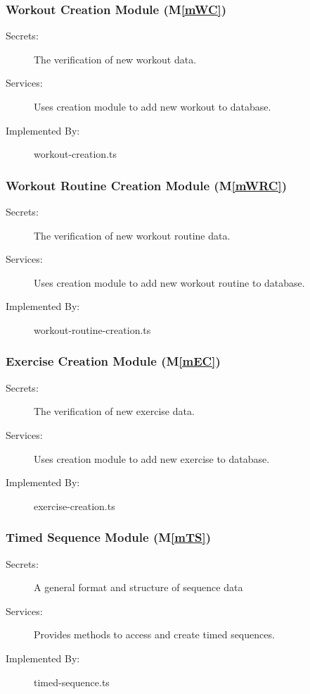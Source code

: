\documentclass[12pt, titlepage]{article}
\newcommand{\mref}[1]{M\ref{#1}}
\begin{document}
\subsubsection{Workout Creation Module (\mref{mWC})}

\begin{description}
\item[Secrets:] The verification of new workout data.
\item[Services:] Uses creation module to add new workout to database.
\item[Implemented By:] workout-creation.ts
\end{description}

\subsubsection{Workout Routine Creation Module (\mref{mWRC})}

\begin{description}
\item[Secrets:] The verification of new workout routine data.
\item[Services:] Uses creation module to add new workout routine to database.
\item[Implemented By:] workout-routine-creation.ts
\end{description}

\subsubsection{Exercise Creation Module (\mref{mEC})}

\begin{description}
\item[Secrets:] The verification of new exercise data.
\item[Services:] Uses creation module to add new exercise to database.
\item[Implemented By:] exercise-creation.ts
\end{description}

\subsubsection{Timed Sequence Module (\mref{mTS})}

\begin{description}
\item[Secrets:] A general format and structure of sequence data
\item[Services:] Provides methods to access and create timed sequences.
\item[Implemented By:] timed-sequence.ts
\end{description}
\end{document}
